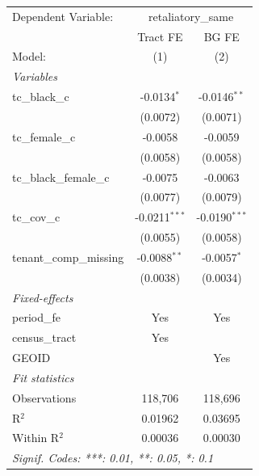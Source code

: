 \begingroup
\centering
\begin{tabular}{lcc}
   \tabularnewline \midrule \midrule
   Dependent Variable: & \multicolumn{2}{c}{retaliatory\_same}\\
                           & Tract FE        & BG FE \\   
   Model:                  & (1)             & (2)\\  
   \midrule
   \emph{Variables}\\
   tc\_black\_c            & -0.0134$^{*}$   & -0.0146$^{**}$\\   
                           & (0.0072)        & (0.0071)\\   
   tc\_female\_c           & -0.0058         & -0.0059\\   
                           & (0.0058)        & (0.0058)\\   
   tc\_black\_female\_c    & -0.0075         & -0.0063\\   
                           & (0.0077)        & (0.0079)\\   
   tc\_cov\_c              & -0.0211$^{***}$ & -0.0190$^{***}$\\   
                           & (0.0055)        & (0.0058)\\   
   tenant\_comp\_missing   & -0.0088$^{**}$  & -0.0057$^{*}$\\   
                           & (0.0038)        & (0.0034)\\   
   \midrule
   \emph{Fixed-effects}\\
   period\_fe              & Yes             & Yes\\  
   census\_tract           & Yes             & \\  
   GEOID                   &                 & Yes\\  
   \midrule
   \emph{Fit statistics}\\
   Observations            & 118,706         & 118,696\\  
   R$^2$                   & 0.01962         & 0.03695\\  
   Within R$^2$            & 0.00036         & 0.00030\\  
   \midrule \midrule
   \multicolumn{3}{l}{\emph{Signif. Codes: ***: 0.01, **: 0.05, *: 0.1}}\\
\end{tabular}
\par\endgroup
\begingroup
\centering
